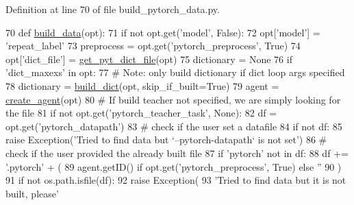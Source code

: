Definition at line 70 of file build\+\_\+pytorch\+\_\+data.\+py.


\begin{DoxyCode}
70 \textcolor{keyword}{def }\hyperlink{namespaceparlai_1_1scripts_1_1build__pytorch__data_a50d93b1dec37499085b9eafc6e425a1a}{build\_data}(opt):
71     \textcolor{keywordflow}{if} \textcolor{keywordflow}{not} opt.get(\textcolor{stringliteral}{'model'}, \textcolor{keyword}{False}):
72         opt[\textcolor{stringliteral}{'model'}] = \textcolor{stringliteral}{'repeat\_label'}
73     preprocess = opt.get(\textcolor{stringliteral}{'pytorch\_preprocess'}, \textcolor{keyword}{True})
74     opt[\textcolor{stringliteral}{'dict\_file'}] = \hyperlink{namespaceparlai_1_1scripts_1_1build__pytorch__data_a6ec85a5842150af78f5178d75075b0cc}{get\_pyt\_dict\_file}(opt)
75     dictionary = \textcolor{keywordtype}{None}
76     \textcolor{keywordflow}{if} \textcolor{stringliteral}{'dict\_maxexs'} \textcolor{keywordflow}{in} opt:
77         \textcolor{comment}{# Note: only build dictionary if dict loop args specified}
78         dictionary = \hyperlink{namespacebuild__dict}{build\_dict}(opt, skip\_if\_built=\textcolor{keyword}{True})
79     agent = \hyperlink{namespaceparlai_1_1core_1_1agents_a00d77a7e26fb89e8bd900f7b2a02982a}{create\_agent}(opt)
80     \textcolor{comment}{# If build teacher not specified, we are simply looking for the file}
81     \textcolor{keywordflow}{if} \textcolor{keywordflow}{not} opt.get(\textcolor{stringliteral}{'pytorch\_teacher\_task'}, \textcolor{keywordtype}{None}):
82         df = opt.get(\textcolor{stringliteral}{'pytorch\_datapath'})
83         \textcolor{comment}{# check if the user set a datafile}
84         \textcolor{keywordflow}{if} \textcolor{keywordflow}{not} df:
85             \textcolor{keywordflow}{raise} Exception(\textcolor{stringliteral}{'Tried to find data but `--pytorch-datapath` is not set'})
86         \textcolor{comment}{# check if the user provided the already built file}
87         \textcolor{keywordflow}{if} \textcolor{stringliteral}{'pytorch'} \textcolor{keywordflow}{not} \textcolor{keywordflow}{in} df:
88             df += \textcolor{stringliteral}{'.pytorch'} + (
89                 agent.getID() \textcolor{keywordflow}{if} opt.get(\textcolor{stringliteral}{'pytorch\_preprocess'}, \textcolor{keyword}{True}) \textcolor{keywordflow}{else} \textcolor{stringliteral}{''}
90             )
91         \textcolor{keywordflow}{if} \textcolor{keywordflow}{not} os.path.isfile(df):
92             \textcolor{keywordflow}{raise} Exception(
93                 \textcolor{stringliteral}{'Tried to find data but it is not built, please'}

\end{DoxyCode}
